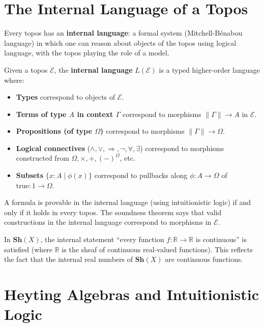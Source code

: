 \section{The Internal Language of a Topos}

Every topos has an \textbf{internal language}: a formal system (Mitchell-Bénabou language) in which one can reason about objects of the topos using logical language, with the topos playing the role of a model.

\begin{definition}
Given a topos $\mathcal{E}$, the \textbf{internal language} $L(\mathcal{E})$ is a typed higher-order language where:
\begin{itemize}
  \item \textbf{Types} correspond to objects of $\mathcal{E}$.
  \item \textbf{Terms of type $A$ in context $\Gamma$} correspond to morphisms $\|\Gamma\| \to A$ in $\mathcal{E}$.
  \item \textbf{Propositions (of type $\Omega$)} correspond to morphisms $\|\Gamma\| \to \Omega$.
  \item \textbf{Logical connectives} ($\wedge, \vee, \Rightarrow, \neg, \forall, \exists$) correspond to morphisms constructed from $\Omega, \times, +, (-)^\Omega$, etc.
  \item \textbf{Subsets} $\{x: A \mid \phi(x)\}$ correspond to pullbacks along $\phi: A \to \Omega$ of $\mathrm{true}: 1 \to \Omega$.
\end{itemize}
\end{definition}

\begin{theorem}
A formula is provable in the internal language (using intuitionistic logic) if and only if it holds in every topos. The soundness theorem says that valid constructions in the internal language correspond to morphisms in $\mathcal{E}$.
\end{theorem}

\begin{example}
In $\mathbf{Sh}(X)$, the internal statement ``every function $f: \mathbb{R} \to \mathbb{R}$ is continuous'' is satisfied (where $\mathbb{R}$ is the sheaf of continuous real-valued functions). This reflects the fact that the internal real numbers of $\mathbf{Sh}(X)$ are continuous functions.
\end{example}

\section{Heyting Algebras and Intuitionistic Logic}

